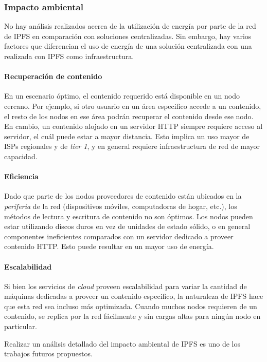 \subsubsection{Impacto ambiental}

No hay análisis realizados acerca de la utilización de energía por parte de la red de IPFS en comparación con soluciones centralizadas. Sin embargo, hay varios factores que diferencian el uso de energía de una solución centralizada con una realizada con IPFS como infraestructura.

\paragraph{Recuperación de contenido} En un escenario óptimo, el contenido requerido está disponible en un nodo cercano. Por ejemplo, si otro usuario en un área especifico accede a un contenido, el resto de los nodos en ese área podrán recuperar el contenido desde ese nodo. En cambio, un contenido alojado en un servidor HTTP siempre requiere acceso al servidor, el cuál puede estar a mayor distancia. Esto implica un uso mayor de ISPs regionales y de \textit{tier 1}, y en general requiere infraestructura de red de mayor capacidad.

\paragraph{Eficiencia} Dado que parte de los nodos proveedores de contenido están ubicados en la \textit{periferia} de la red (dispositivos móviles, computadoras de hogar, etc.), los métodos de lectura y escritura de contenido no son óptimos. Los nodos pueden estar utilizando discos duros en vez de unidades de estado sólido, o en general componentes ineficientes comparados con un servidor dedicado a proveer contenido HTTP. Esto puede resultar en un mayor uso de energía.

\paragraph{Escalabilidad} Si bien los servicios de \textit{cloud} proveen escalabilidad para variar la cantidad de máquinas dedicadas a proveer un contenido especifico, la naturaleza de IPFS hace que esta red sea incluso más optimizada. Cuando muchos nodos requieren de un contenido, se replica por la red fácilmente y sin cargas altas para ningún nodo en particular.

Realizar un análisis detallado del impacto ambiental de IPFS es uno de los trabajos futuros propuestos.

